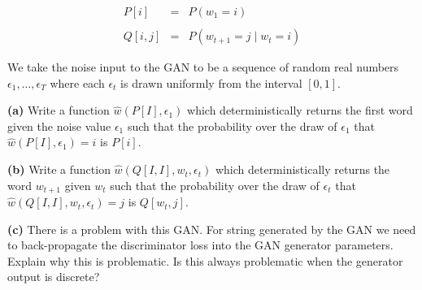 \documentclass{article}
\newcommand{\solution}[1]{}
\begin{document}
\begin{eqnarray*}
  P[i] & = & P(w_1 = i) \\
  \\
  Q[i,j] & = & P(w_{t+1} = j\;|\; w_t = i)
\end{eqnarray*}

We take the noise input to the GAN to be a sequence of random real numbers $\epsilon_1,\ldots,\epsilon_T$ where each $\epsilon_t$ is drawn uniformly from the interval $[0,1]$.

{\bf (a)} Write a function $\hat{w}(P[I],\epsilon_1)$ which deterministically returns the first word given the noise value $\epsilon_1$ such that the probability over the draw of $\epsilon_1$
that $\hat{w}(P[I],\epsilon_1) = i$ is $P[i]$.

\solution{
  We can take $\hat{w}(P[I],\epsilon_1)$ to be the unique $i$ such that $\epsilon_1 \in \left[\left(\sum_{j<i} P[j]\right),\;\left(\sum_{j \leq i} \;P[j]\right)\right]$
}

{\bf (b)} Write a function $\hat{w}(Q[I,I],w_t,\epsilon_t)$ which deterministically returns the word $w_{t+1}$ given $w_t$ such that the probability over the draw of $\epsilon_t$
that $\hat{w}(Q[I,I],w_t,\epsilon_t) = j$ is $Q[w_t,j]$.

\solution{
  We can take $\hat{w}(Q[I,I],w_t,\epsilon_t)$ to be the unique $w_j$ such that $\epsilon_t \in \left[\left(\sum_{j<i} Q[w_t,j]\right),\;\left(\sum_{k \leq j} \;Q[w_t,j]\right)\right]$
}

{\bf (c)} There is a problem with this GAN.  For string generated by the GAN we need to back-propagate the discriminator loss into the GAN generator parameters.  Explain why this is problematic.
Is this always problematic when the generator output is discrete?

\solution{Yes, there is a problem whever $s$ is discrete. A discrete output will not change under differential updates to the GAN parameters.  Hence the gradient of the discriminator loss
  with respect to the generator parameters is zero.  This will happen for any GAN generatng a discrete output. While there are approaches one can try for discrete GANs, GANs are most effective for modeling
  continuous objects like sounds and images.  It does not help to have the GAN sample from a transformer model. To get a gradient on the generator parameters we need a gradient of the discriminator loss with
  respect to a continuous signal $s$ being generated by the generator.}
\end{document}
